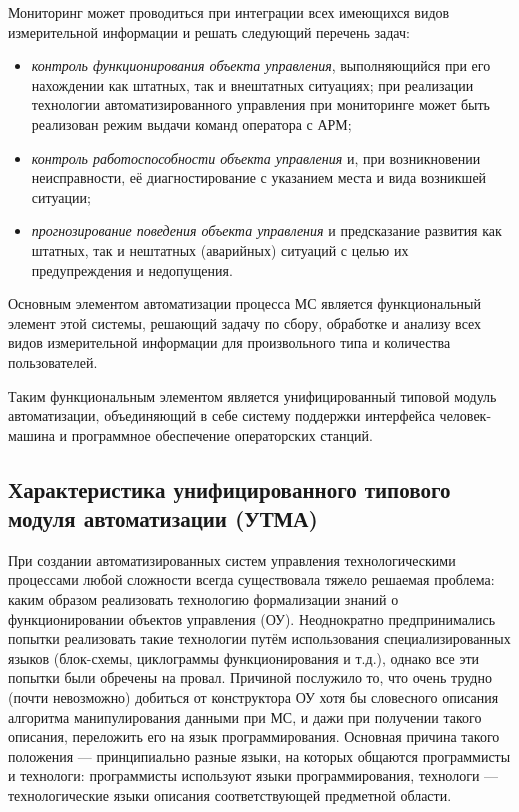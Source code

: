 Мониторинг может проводиться при интеграции всех имеющихся видов
измерительной информации и решать следующий перечень задач:
\begin{itemize}
\item \emph{контроль функционирования объекта управления},
  выполняющийся при его нахождении как штатных, так и внештатных
  ситуациях; при реализации технологии автоматизированного управления
  при мониторинге может быть реализован режим выдачи команд оператора
  с АРМ;
\item \emph{контроль работоспособности объекта управления} и, при
  возникновении неисправности, её диагностирование с указанием места и
  вида возникшей ситуации;
\item \emph{прогнозирование поведения объекта управления} и
  предсказание развития как штатных, так и нештатных (аварийных)
  ситуаций с целью их предупреждения и недопущения.
\end{itemize}

Основным элементом автоматизации процесса МС является функциональный
элемент этой системы, решающий задачу по сбору, обработке и анализу
всех видов измерительной информации для произвольного типа и
количества пользователей.

Таким функциональным элементом является унифицированный типовой модуль
автоматизации, объединяющий в себе систему поддержки интерфейса
че\-ло\-век-ма\-ши\-на и программное обеспечение операторских станций.

\subsection{Характеристика унифицированного типового модуля
  автоматизации (УТМА)}

При создании автоматизированных систем управления технологическими
процессами любой сложности всегда существовала тяжело решаемая
проблема: каким образом реализовать технологию формализации знаний о
функционировании объектов управления (ОУ). Неоднократно
предпринимались попытки реализовать такие технологии путём
использования специализированных языков (блок-схемы, циклограммы
функционирования и т.д.), однако все эти попытки были обречены на
провал. Причиной послужило то, что очень трудно (почти невозможно)
добиться от конструктора ОУ хотя бы словесного описания алгоритма
манипулирования данными при МС, и дажи при получении такого описания,
переложить его на язык программирования. Основная причина такого
положения --- принципиально разные языки, на которых общаются
программисты и технологи: программисты используют языки
программирования, технологи --- технологические языки описания
соответствующей предметной области.


